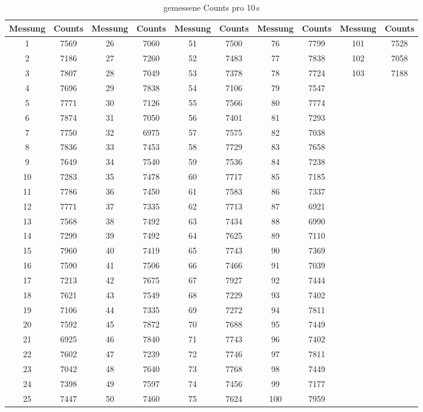\begin{table}
  \centering
  \caption{gemessene Counts pro 10\,s}
  \label{tab:e}
  \begin{tabular}{c c|c c|c c|c c|c c}
    \toprule
    Messung & Counts & Messung & Counts & Messung & Counts & Messung & Counts & Messung & Counts \\
    \midrule
    1  & 7569 & 26 & 7060 & 51 & 7500 & 76 & 7799 & 101 & 7528 \\
    2  & 7186 & 27 & 7260 & 52 & 7483 & 77 & 7838 & 102 & 7058 \\
    3  & 7807 & 28 & 7049 & 53 & 7378 & 78 & 7724 & 103 & 7188 \\
    4  & 7696 & 29 & 7838 & 54 & 7106 & 79 & 7547 & & \\
    5  & 7771 & 30 & 7126 & 55 & 7566 & 80 & 7774 & & \\
    6  & 7874 & 31 & 7050 & 56 & 7401 & 81 & 7293 & & \\
    7  & 7750 & 32 & 6975 & 57 & 7575 & 82 & 7038 & & \\
    8  & 7836 & 33 & 7453 & 58 & 7729 & 83 & 7658 & & \\
    9  & 7649 & 34 & 7540 & 59 & 7536 & 84 & 7238 & & \\
    10 & 7283 & 35 & 7478 & 60 & 7717 & 85 & 7185 & & \\
    11 & 7786 & 36 & 7450 & 61 & 7583 & 86 & 7337 & & \\
    12 & 7771 & 37 & 7335 & 62 & 7713 & 87 & 6921 & & \\
    13 & 7568 & 38 & 7492 & 63 & 7434 & 88 & 6990 & & \\
    14 & 7299 & 39 & 7492 & 64 & 7625 & 89 & 7110 & & \\
    15 & 7960 & 40 & 7419 & 65 & 7743 & 90 & 7369 & & \\
    16 & 7590 & 41 & 7506 & 66 & 7466 & 91 & 7039 & & \\
    17 & 7213 & 42 & 7675 & 67 & 7927 & 92 & 7444 & & \\
    18 & 7621 & 43 & 7549 & 68 & 7229 & 93 & 7402 & & \\
    19 & 7106 & 44 & 7335 & 69 & 7272 & 94 & 7811 & & \\
    20 & 7592 & 45 & 7872 & 70 & 7688 & 95 & 7449 & & \\
    21 & 6925 & 46 & 7840 & 71 & 7743 & 96 & 7402 & & \\
    22 & 7602 & 47 & 7239 & 72 & 7746 & 97 & 7811 & & \\
    23 & 7042 & 48 & 7640 & 73 & 7768 & 98 & 7449 & & \\
    24 & 7398 & 49 & 7597 & 74 & 7456 & 99 & 7177 & & \\
    25 & 7447 & 50 & 7460 & 75 & 7624 & 100& 7959 & & \\
    \bottomrule
  \end{tabular}
\end{table}

